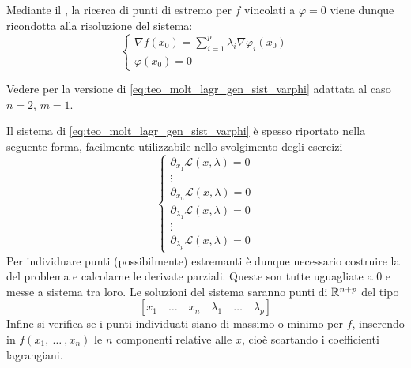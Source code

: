 \begin{samepage}
	\begin{observation}
		\label{obs:sist_eqiv_lagr}
		Mediante il , la ricerca di punti di estremo per $f$ vincolati a $\varphi = 0$ viene dunque ricondotta alla risoluzione del sistema:
		\begin{equation}
			\label{eq:teo_molt_lagr_gen_sist_varphi}
			\begin{cases}
				\nabla f(x_0) = \sum\limits_{i = 1}^{p} \lambda_i \nabla \varphi_i (x_0)\\
				\varphi(x_0) = 0
			\end{cases}
		\end{equation}
		\vspace*{-.5\baselineskip}
		\begin{note}
			Vedere  per la versione di \cref{eq:teo_molt_lagr_gen_sist_varphi} adattata al caso $n=2,\,m=1$.
		\end{note}
	\end{observation}
\end{samepage}
\begin{observation}
	\label{obs:sist_eqiv_lagr_ese}
	Il sistema di \cref{eq:teo_molt_lagr_gen_sist_varphi} è spesso riportato nella seguente forma, facilmente utilizzabile nello svolgimento degli esercizi
	\[
		\begin{cases}
			\partial_{x_1} \mathcal{L}(x, \lambda) = 0\\
			\vdots\\
			\partial_{x_n} \mathcal{L}(x, \lambda) = 0\\
			\partial_{\lambda_1} \mathcal{L}(x, \lambda) = 0\\
			\vdots\\
			\partial_{\lambda_p} \mathcal{L}(x, \lambda) = 0
		\end{cases}
	\]
	Per individuare punti (possibilmente) estremanti è dunque necessario costruire la  del problema e calcolarne le derivate parziali. Queste son tutte uguagliate a $0$ e messe a sistema tra loro. Le soluzioni del sistema saranno punti di $\mathbb{R}^{n + p}$ del tipo
	\[\left[ x_1 \quad \dots \quad x_n \quad \lambda_1 \quad \dots \quad \lambda_p \right]\]
	Infine si verifica se i punti individuati siano di massimo o minimo per $f$, inserendo in $f(x_1,\:\dotsc\:,x_n)$ le $n$ componenti relative alle $x$, cioè scartando i coefficienti lagrangiani.
\end{observation}
